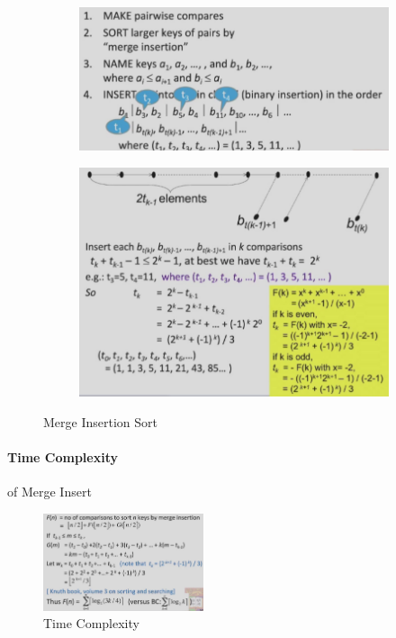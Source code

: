 \begin{figure}[H]
    \centering
    \begin{subfigure}{0.42\textwidth}
        \centering
        \includegraphics[width=\textwidth]{pic/DAA1/Merge Insertion Sort1}
    \end{subfigure}
    \begin{subfigure}{0.42\textwidth}
        \centering
        \includegraphics[width=\textwidth]{pic/DAA1/Merge Insertion Sort2}
    \end{subfigure}
    \caption{Merge Insertion Sort}
\end{figure}

\paragraph{Time Complexity} of Merge Insert
\begin{figure}[H]
    \centering
    \includegraphics[width=0.42\textwidth]{pic/DAA1/Time Complexity}
    \caption{Time Complexity}
\end{figure}

